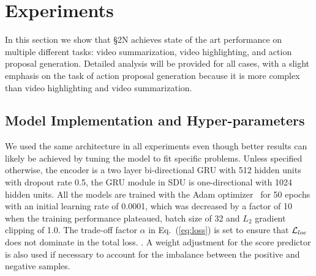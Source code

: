 \documentclass[10pt,journal,compsoc]{IEEEtran}
\begin{document}


\section{Experiments}

In this section we show that \S2N achieves state of the art performance on multiple different tasks: video summarization, video highlighting, and action proposal generation. Detailed analysis will be provided for all cases, with a slight emphasis on the task of action proposal generation because it is more complex than video highlighting and video summarization. 

\subsection{Model Implementation and Hyper-parameters}
We used the same architecture in all experiments even though better results can likely be achieved by tuning the model to fit specific problems. 
Unless specified otherwise, the encoder is a two layer bi-directional GRU with 512 hidden units with dropout rate 0.5, the GRU module in SDU is one-directional with 1024 hidden units. All the models are trained with the Adam optimizer~\cite{kingma2014adam} for 50 epochs with an initial learning rate of 0.0001, which was decreased by a factor of 10 when the training performance plateaued, batch size of 32 and $L_2$ gradient clipping of 1.0. The trade-off factor $\alpha$ in Eq.~(\ref{eq:loss}) is set to ensure that $\mathcal{L}_{loc}$ does not dominate in the total loss. .
A weight adjustment for the score predictor is also used if necessary to account for the imbalance between the positive and negative samples. 

\end{document}

